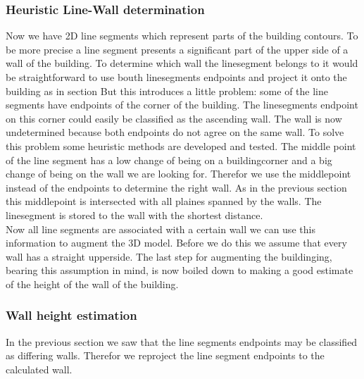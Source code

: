 \subsubsection{Heuristic Line-Wall determination}
	Now we have 2D line segments which represent parts of the building contours. To be more precise a line segment presents a significant part of the upper side of a wall of the building.
	To determine which wall the linesegment belongs to it would be straightforward to use bouth linesegments endpoints and project it onto the building as in section %
	But this introduces a little problem: some of the line segments have endpoints of the corner of the building.
	The linesegments endpoint on this corner could easily be classified as the ascending wall.
	The wall is now undetermined because both endpoints do not agree on the same wall.  
	To solve this problem some heuristic methods are developed and tested.
	The middle point of the line segment has a low change of being on a buildingcorner and a big change of being on the wall we are looking for.
	Therefor we use the middlepoint instead of the endpoints to determine the right wall.
	As in the previous section %
	this middlepoint is intersected with all plaines spanned by the walls. The linesegment is stored to the wall with the shortest distance.
	\\
	Now all line segments are associated with a certain wall we can use this information to augment the 3D model.
	Before we do this we assume that every wall has a straight upperside. %
	The last step for augmenting the buildinging, bearing this assumption in mind, is now boiled down to making a good estimate of the height of the wall of the building.

	


\subsubsection{Wall height estimation}
	In the previous section we saw that the line segments endpoints may be classified as differing walls. 
	Therefor we reproject the line segment endpoints to the calculated wall.

